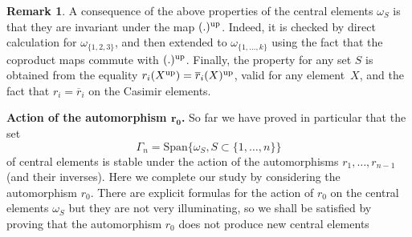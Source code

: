 \documentclass[10pt,a4paper]{amsart}
\numberwithin{equation}{section}
\theoremstyle{definition}
\newtheorem{rema}[theo]{Remark}
\newcommand{\rb}{\overline{r}}
\begin{document}
\begin{rema}\label{rema:omegaUp}
A consequence of the above properties of the central elements $\omega_S$ is that they are invariant under the map $(.)^{\rm up}$.
Indeed, it is checked by direct calculation for $\omega_{\{1,2,3\}}$, and then extended to $\omega_{\{1,\dots,k\}}$ using the fact that the coproduct maps commute with $(.)^{\rm up}$. Finally, the property for any set $S$ is obtained from the equality $r_i(X^{\rm up})=\rb_i(X)^{\rm up}$, valid for any element~$X$, and the fact that $r_i=\rb_i$
on the Casimir elements.
\end{rema}

{\bf Action of the automorphism $\boldsymbol{r_0}$.} So far we have proved in particular that the set
\begin{equation*}
\Gamma_n = \text{Span}\{\omega_S , S\subset\{1,\dots,n\}\}
\end{equation*}
of central elements is stable under the action of the automorphisms $r_1,\dots,r_{n-1}$ (and their inverses). Here we complete our study by considering the automorphism $r_0$. There are explicit formulas for the action of $r_0$ on the central elements $\omega_S$ but they are not very illuminating, so we shall be satisfied by proving that the automorphism $r_0$ does not produce new central elements
\end{document}
